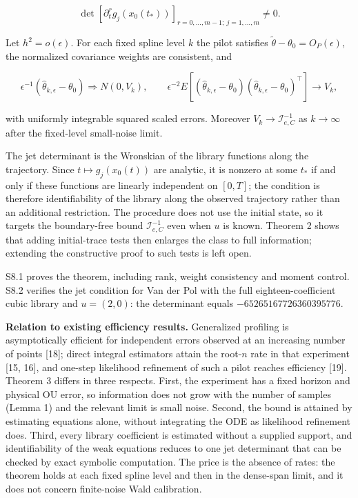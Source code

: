 \documentclass[
  american,
  11pt,
]{article}
\begin{document}
\[
\det[\partial_t^r g_j(x_0(t_*))]_{r=0,\ldots,m-1;\ j=1,\ldots,m}\ne0.
\]

Let \(h^2=o(\epsilon)\). For each fixed spline level \(k\) the pilot
satisfies \(\widetilde\theta-\theta_0=O_P(\epsilon)\), the normalized
covariance weights are consistent, and

\[
\epsilon^{-1}(\widehat\theta_{k,\epsilon}-\theta_0)\Rightarrow N(0,V_k),\qquad
\epsilon^{-2}E[(\widehat\theta_{k,\epsilon}-\theta_0)(\widehat\theta_{k,\epsilon}-\theta_0)^\top]\to V_k,
\]

with uniformly integrable squared scaled errors. Moreover
\(V_k\to\mathcal I_{e,C}^{-1}\) as \(k\to\infty\) after the fixed-level
small-noise limit.

The jet determinant is the Wronskian of the library functions along the
trajectory. Since \(t\mapsto g_j(x_0(t))\) are analytic, it is nonzero
at some \(t_*\) if and only if these functions are linearly independent
on \([0,T]\); the condition is therefore identifiability of the library
along the observed trajectory rather than an additional restriction. The
procedure does not use the initial state, so it targets the
boundary-free bound \(\mathcal I_{e,C}^{-1}\) even when \(u\) is known.
Theorem 2 shows that adding initial-trace tests then enlarges the class
to full information; extending the constructive proof to such tests is
left open.

S8.1 proves the theorem, including rank, weight consistency and moment
control. S8.2 verifies the jet condition for Van der Pol with the full
eighteen-coefficient cubic library and \(u=(2,0)\): the determinant
equals \(-65265167726360395776\).

\textbf{Relation to existing efficiency results.} Generalized profiling
is asymptotically efficient for independent errors observed at an
increasing number of points {[}18{]}; direct integral estimators attain
the root-\(n\) rate in that experiment {[}15, 16{]}, and one-step
likelihood refinement of such a pilot reaches efficiency {[}19{]}.
Theorem 3 differs in three respects. First, the experiment has a fixed
horizon and physical OU error, so information does not grow with the
number of samples (Lemma 1) and the relevant limit is small noise.
Second, the bound is attained by estimating equations alone, without
integrating the ODE as likelihood refinement does. Third, every library
coefficient is estimated without a supplied support, and identifiability
of the weak equations reduces to one jet determinant that can be checked
by exact symbolic computation. The price is the absence of rates: the
theorem holds at each fixed spline level and then in the dense-span
limit, and it does not concern finite-noise Wald calibration.
\end{document}
